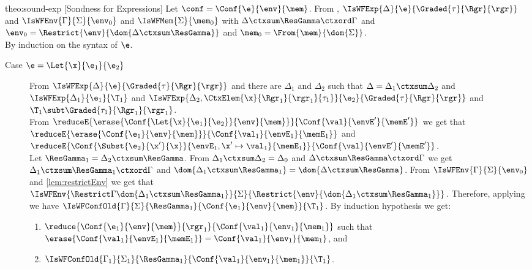 \begin{proofOf}{theo:sound-exp} [Sondness for Expressions]
\smallskip\noindent
Let $\conf=\Conf{\e}{\env}{\mem}$. From , $\IsWFExp{\Delta}{\e}{\Graded{\tau}{\Rgr}{\rgr}}$ and 
$\IsWFEnv{\Gamma}{\Sigma}{\env_0}$ and $\IsWFMem{\Sigma}{\mem_0}$ with $\Delta\ctxsum\ResGamma\ctxord\Gamma$ and
 $\env_0=\Restrict{\env}{\dom{\Delta\ctxsum\ResGamma}}$ and $\mem_0=\From{\mem}{\dom{\Sigma}}$.\\
By induction on the syntax of $\e$. 
\begin{description}
\item [Case $\e=\Let{\x}{\e_1}{\e_2}$]
From $\IsWFExp{\Delta}{\e}{\Graded{\tau}{\Rgr}{\rgr}}$ and  
 there are $\Delta_1$ and $\Delta_2$  such that  
$\Delta=\Delta_1\ctxsum\Delta_2$ and $\IsWFExp{\Delta_1}{\e_1}{\T_1}$ and $\IsWFExp{\Delta_2,\CtxElem{\x}{\Rgr_1}{\rgr_1}{\tau_1}}{\e_2}{\Graded{\tau}{\Rgr}{\rgr}}$ and
$\T_1\subt\Graded{\tau_1}{\Rgr_1}{\rgr_1}$.\\
From $\reduceE{\erase{\Conf{\Let{\x}{\e_1}{\e_2}}{\env}{\mem}}}{{\Conf{\val}{\envE'}{\memE'}}}$ we get that 
$\reduceE{\erase{\Conf{\e_1}{\env}{\mem}}}{\Conf{\val_1}{\envE_1}{\memE_1}}$ and 
$\reduceE{{\Conf{\Subst{\e_2}{\x'}{\x}}{{\envE_1},\x'\mapsto\val_1}{\memE_1}}}{{\Conf{\val}{\envE'}{\memE'}}}$.\\
%
Let $\ResGamma_1=\Delta_2\ctxsum\ResGamma$.  From $\Delta_1\ctxsum\Delta_2=\Delta_0$ and $\Delta\ctxsum\ResGamma\ctxord\Gamma$
we get $\Delta_1\ctxsum\ResGamma_1\ctxord\Gamma$ and $\dom{\Delta_1\ctxsum\ResGamma_1}=\dom{\Delta\ctxsum\ResGamma}$.
From  $\IsWFEnv{\Gamma}{\Sigma}{\env_0}$ and \cref{lem:restrictEnv} we get that   $\IsWFEnv{\Restrict\Gamma{\dom{\Delta_1\ctxsum\ResGamma_1}}}{\Sigma}{\Restrict{\env}{\dom{\Delta_1\ctxsum\ResGamma_1}}}$. Therefore,
applying  we have $\IsWFConfOld{\Gamma}{\Sigma}{\ResGamma_1}{\Conf{\e_1}{\env}{\mem}}{\T_1}$. By induction hypothesis
we get:
\begin{enumerate}
\item \label{it1} $\reduce{\Conf{\e_1}{\env}{\mem}}{\rgr_1}{\Conf{\val_1}{\env_1}{\mem_1}}$ such that $\erase{\Conf{\val_1}{\envE_1}{\memE_1}}=\Conf{\val_1}{\env_1}{\mem_1}$, and 
\item \label{it2} $\IsWFConfOld{\Gamma_1}{\Sigma_1}{\ResGamma_1}{\Conf{\val_1}{\env_1}{\mem_1}}{\T_1}$. %
\end{enumerate}

\end{description}
\end{proofOf}

